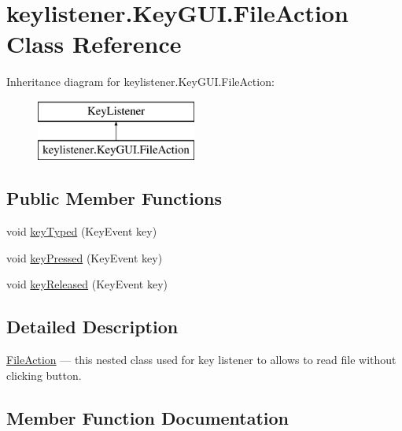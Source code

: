 \hypertarget{classkeylistener_1_1_key_g_u_i_1_1_file_action}{}\section{keylistener.\+Key\+G\+U\+I.\+File\+Action Class Reference}
\label{classkeylistener_1_1_key_g_u_i_1_1_file_action}
Inheritance diagram for keylistener.\+Key\+G\+U\+I.\+File\+Action\+:\begin{figure}[H]
\begin{center}
\leavevmode
\includegraphics[height=2.000000cm]{classkeylistener_1_1_key_g_u_i_1_1_file_action}
\end{center}
\end{figure}
\subsection*{Public Member Functions}
\begin{DoxyCompactItemize}
\item 
void \hyperlink{classkeylistener_1_1_key_g_u_i_1_1_file_action_a5cb1793448cd9291933750efd413d1ec}{key\+Typed} (Key\+Event key)
\item 
void \hyperlink{classkeylistener_1_1_key_g_u_i_1_1_file_action_a4bff4226326e6793a5880ef998a4fac4}{key\+Pressed} (Key\+Event key)
\item 
void \hyperlink{classkeylistener_1_1_key_g_u_i_1_1_file_action_a6e55f00ff53af6877115fb94765d64e4}{key\+Released} (Key\+Event key)
\end{DoxyCompactItemize}


\subsection{Detailed Description}
\hyperlink{classkeylistener_1_1_key_g_u_i_1_1_file_action}{File\+Action} --- this nested class used for key listener to allows to read file without clicking button. 

\subsection{Member Function Documentation}
\mbox{\label{classkeylistener_1_1_key_g_u_i_1_1_file_action_a4bff4226326e6793a5880ef998a4fac4}} 
